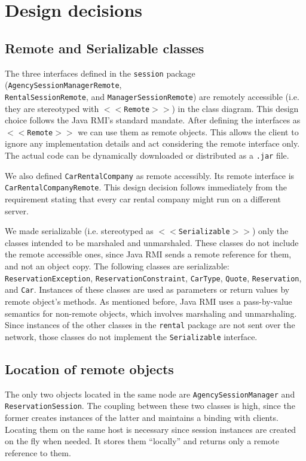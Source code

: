 \section{Design decisions}
\subsection{Remote and Serializable classes}
The three interfaces defined in the \texttt{session} package (\texttt{AgencySessionManagerRemote}, \\\texttt{RentalSessionRemote}, and \texttt{ManagerSessionRemote}) are remotely accessible (i.e. they are stereotyped with \texttt{$<<$Remote$>>$}) in the class diagram. This design choice follows the Java RMI's standard mandate. After defining the interfaces as \texttt{$<<$Remote$>>$} we can use them as remote objects. This allows the client to ignore any implementation details and act considering the remote interface only. The actual code can be dynamically downloaded or distributed as a \texttt{.jar} file.

We also defined \texttt{CarRentalCompany} as remote accessibly. Its remote interface is \\\texttt{CarRentalCompanyRemote}. This design decision follows immediately from the requirement stating that every car rental company might run on a different server. 

We made serializable (i.e. stereotyped as \texttt{$<<$Serializable$>>$}) only the classes intended to be marshaled and unmarshaled. These classes do not include the remote accessible ones, since Java RMI sends a remote reference for them, and not an object copy. The following classes are serializable: \texttt{ReservationException}, \texttt{ReservationConstraint}, \texttt{CarType}, \texttt{Quote}, \texttt{Reservation}, and \texttt{Car}. Instances of these classes are used as parameters or return values by remote object's methods. As mentioned before, Java RMI uses a pass-by-value semantics for non-remote objects, which involves marshaling and unmarshaling. Since instances of the other classes in the \texttt{rental} package are not sent over the network, those classes do not implement the \texttt{Serializable} interface. 

\subsection{Location of remote objects}
The only two objects located in the same node are \texttt{AgencySessionManager} and \texttt{ReservationSession}. The coupling between these two classes is high, since the former creates instances of the latter and maintains a binding with clients. Locating them on the same host is necessary since session instances are created on the fly when needed. It stores them ``locally'' and returns only a remote reference to them. 

